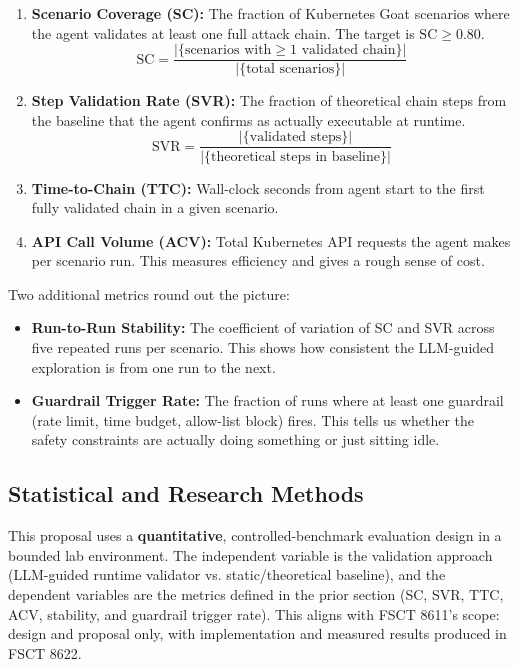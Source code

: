 \documentclass[conference]{IEEEtran}
\begin{document}
\begin{enumerate}
    \item \textbf{Scenario Coverage (SC):} The fraction of Kubernetes Goat scenarios where the agent validates at least one full attack chain. The target is $\text{SC} \geq 0.80$.
    \begin{equation}
        \text{SC} = \frac{|\{\text{scenarios with} \geq 1 \text{ validated chain}\}|}{|\{\text{total scenarios}\}|}
    \end{equation}

    \item \textbf{Step Validation Rate (SVR):} The fraction of theoretical chain steps from the baseline that the agent confirms as actually executable at runtime.
    \begin{equation}
        \text{SVR} = \frac{|\{\text{validated steps}\}|}{|\{\text{theoretical steps in baseline}\}|}
    \end{equation}

    \item \textbf{Time-to-Chain (TTC):} Wall-clock seconds from agent start to the first fully validated chain in a given scenario.

    \item \textbf{API Call Volume (ACV):} Total Kubernetes API requests the agent makes per scenario run. This measures efficiency and gives a rough sense of cost.
\end{enumerate}

Two additional metrics round out the picture:
\begin{itemize}
    \item \textbf{Run-to-Run Stability:} The coefficient of variation of SC and SVR across five repeated runs per scenario. This shows how consistent the LLM-guided exploration is from one run to the next.
    \item \textbf{Guardrail Trigger Rate:} The fraction of runs where at least one guardrail (rate limit, time budget, allow-list block) fires. This tells us whether the safety constraints are actually doing something or just sitting idle.
\end{itemize}

\subsection{Statistical and Research Methods}

This proposal uses a \textbf{quantitative}, controlled-benchmark evaluation design in a bounded lab environment. The independent variable is the validation approach (LLM-guided runtime validator vs. static/theoretical baseline), and the dependent variables are the metrics defined in the prior section (SC, SVR, TTC, ACV, stability, and guardrail trigger rate). This aligns with FSCT 8611's scope: design and proposal only, with implementation and measured results produced in FSCT 8622.
\end{document}
